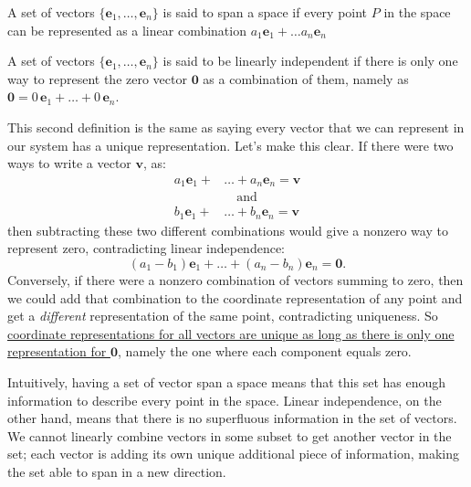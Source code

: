 \documentclass[../master.tex]{subfiles}
\begin{document}
	\begin{defn}
		A set of vectors $\{ \mathbf e_1, \dots, \mathbf e_n \}$ is said to span a space if every point $P$ in the space can be represented as a linear combination $a_1 \mathbf e_1 + \dots a_n \mathbf e_n$
	\end{defn}
	
	\begin{defn}
		A set of vectors $\{\mathbf e_1, \dots , \mathbf e_n \}$ is said to be linearly independent if there is only one way to represent the zero vector $\mathbf 0$ as a combination of them, namely as $\mathbf 0 = 0\,\mathbf e_1 + \dots + 0\,\mathbf e_n$.
	\end{defn}
	
	This second definition is the same as saying every vector that we can represent in our system has a unique representation. Let's make this clear. If there were two ways to write a vector $\mathbf v$, as:
	\begin{equation*}
		\begin{aligned}
			a_1 \mathbf e_1 + &\dots + a_n \mathbf e_n = \mathbf v\\
			& \quad \mathrm{and}\\
			b_1 \mathbf e_1 + &\dots + b_n \mathbf e_n = \mathbf v
		\end{aligned}
	\end{equation*}
	then subtracting these two different combinations would give a nonzero way to represent zero, contradicting linear independence:
	\begin{equation*}
		(a_1 - b_1) \mathbf e_1 + \dots + (a_n - b_n) \mathbf e_n = \mathbf 0.
	\end{equation*}
	Conversely, if there were a nonzero combination of vectors summing to zero, then we could add that combination to the coordinate representation of any point and get a \emph{different} representation of the same point, contradicting uniqueness. So \ul{coordinate representations for all vectors are unique as long as there is only one representation for $\mathbf 0$}, namely the one where each component equals zero.
	
	Intuitively, having a set of vector span a space means that this set has enough information to describe every point in the space. Linear independence, on the other hand, means that there is no superfluous information in the set of vectors.  We cannot linearly combine vectors in some subset to get another vector in the set; each vector is adding its own unique additional piece of information, making the set able to span in a new direction. 
	
\end{document}
